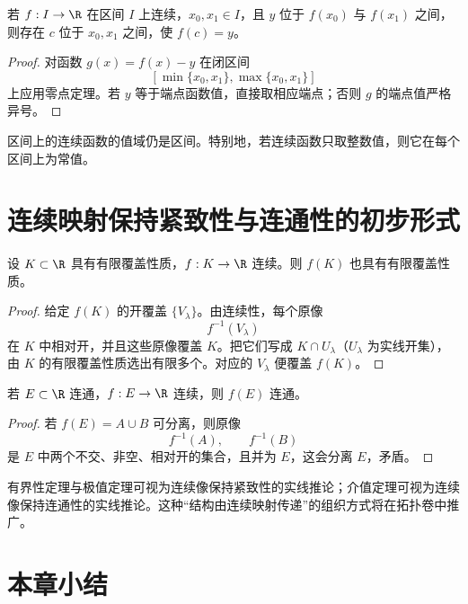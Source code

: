 \begin{theorem}[介值定理]
若 \(f:I\to\R\) 在区间 \(I\) 上连续，\(x_0,x_1\in I\)，且 \(y\) 位于 \(f(x_0)\) 与 \(f(x_1)\) 之间，则存在 \(c\) 位于 \(x_0,x_1\) 之间，使 \(f(c)=y\)。
\end{theorem}

\begin{proof}
对函数 \(g(x)=f(x)-y\) 在闭区间
\[
 [\min\{x_0,x_1\},\max\{x_0,x_1\}]
\]
上应用零点定理。若 \(y\) 等于端点函数值，直接取相应端点；否则 \(g\) 的端点值严格异号。
\end{proof}

\begin{corollary}
区间上的连续函数的值域仍是区间。特别地，若连续函数只取整数值，则它在每个区间上为常值。
\end{corollary}

\section{连续映射保持紧致性与连通性的初步形式}

\begin{theorem}[连续像保持有限覆盖性质]
设 \(K\subset\R\) 具有有限覆盖性质，\(f:K\to\R\) 连续。则 \(f(K)\) 也具有有限覆盖性质。
\end{theorem}

\begin{proof}
给定 \(f(K)\) 的开覆盖 \(\{V_\lambda\}\)。由连续性，每个原像
\[
 f^{-1}(V_\lambda)
\]
在 \(K\) 中相对开，并且这些原像覆盖 \(K\)。把它们写成 \(K\cap U_\lambda\)（\(U_\lambda\) 为实线开集），由 \(K\) 的有限覆盖性质选出有限多个。对应的 \(V_\lambda\) 便覆盖 \(f(K)\)。
\end{proof}

\begin{theorem}[连续像保持连通性]
若 \(E\subset\R\) 连通，\(f:E\to\R\) 连续，则 \(f(E)\) 连通。
\end{theorem}

\begin{proof}
若 \(f(E)=A\cup B\) 可分离，则原像
\[
 f^{-1}(A),\qquad f^{-1}(B)
\]
是 \(E\) 中两个不交、非空、相对开的集合，且并为 \(E\)，这会分离 \(E\)，矛盾。
\end{proof}

有界性定理与极值定理可视为连续像保持紧致性的实线推论；介值定理可视为连续像保持连通性的实线推论。这种“结构由连续映射传递”的组织方式将在拓扑卷中推广。

\section*{本章小结}

